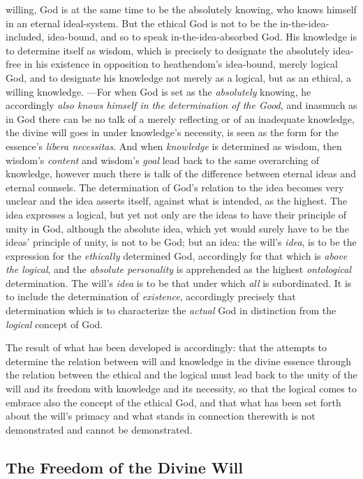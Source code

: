 \documentclass[12pt,a4paper]{book}
\begin{document}
willing, God is at the same time to be the absolutely knowing, who knows himself in an
eternal ideal-system. But the ethical God is not to be the in-the-idea-included,
idea-bound, and so to speak in-the-idea-absorbed God. His knowledge is to determine
itself as wisdom, which is precisely to designate the absolutely idea-free in his
existence in opposition to heathendom's idea-bound, merely logical God, and to designate
his knowledge not merely as a logical, but as an ethical, a willing knowledge. ---For
when God is set as the \emph{absolutely} knowing, he accordingly \emph{also knows himself in
the determination of the Good}, and inasmuch as in God there can be no talk of a merely
reflecting or of an inadequate knowledge, the divine will goes in under knowledge's
necessity, is seen as the form for the essence's \textit{libera necessitas}. And when
\emph{knowledge} is determined as wisdom, then wisdom's \emph{content} and wisdom's \emph{goal}
lead back to the same overarching of knowledge, however much there is talk of the
difference between eternal ideas and eternal counsels. The determination of God's
relation to the idea becomes very unclear and the idea asserts itself, against what is
intended, as the highest. The idea expresses a logical, but yet not only are the ideas
to have their principle of unity in God, although the absolute idea, which yet would
surely have to be the ideas' principle of unity, is not to be God; but an idea: the
will's \emph{idea}, is to be the expression for the \emph{ethically} determined God, accordingly for
that which is \emph{above the logical}, and the \emph{absolute personality} is apprehended as the
highest \emph{ontological} determination. The will's \emph{idea} is to be that under which \emph{all}
is subordinated. It is to include the determination of \emph{existence}, accordingly precisely
that determination which is to characterize the \emph{actual} God in distinction from the
\emph{logical} concept of God.

The result of what has been developed is accordingly: that the attempts to determine
the relation between will and knowledge in the divine essence through the relation
between the ethical and the logical must lead back to the unity of the will and its
freedom with knowledge and its necessity, so that the logical comes to embrace also the
concept of the ethical God, and that what has been set forth about the will's primacy
and what stands in connection therewith is not demonstrated and cannot be demonstrated.

\subsection{The Freedom of the Divine Will}
\label{ssec:divine-freedom}
\end{document}
